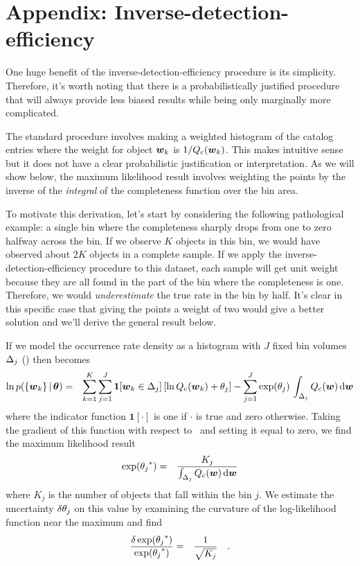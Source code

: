 \section{Appendix: Inverse-detection-efficiency}

One huge benefit of the inverse-detection-efficiency procedure is its
simplicity.
Therefore, it's worth noting that there is a probabilistically justified
procedure that will always provide less biased results while being only
marginally more complicated.

The standard procedure involves making a weighted histogram of the catalog
entries where the weight for object ${{\boldsymbol{w}}}_k$ is $1/{Q_\mathrm{c}}({{\boldsymbol{w}}}_k)$.
This makes intuitive sense but it does not have a clear probabilistic
justification or interpretation.
As we will show below, the maximum likelihood result involves weighting the
points by the inverse of the \emph{integral} of the completeness function over
the bin area.

To motivate this derivation, let's start by considering the following
pathological example: a single bin where the completeness sharply drops from
one to zero halfway across the bin.
If we observe $K$ objects in this bin, we would have observed about $2K$
objects in a complete sample.
If we apply the inverse-detection-efficiency procedure to this dataset, each
sample will get unit weight because they are all found in the part of the bin
where the completeness is one.
Therefore, we would \emph{underestimate} the true rate in the bin by half.
It's clear in this specific case that giving the points a weight of two would
give a better solution and we'll derive the general result below.

If we model the occurrence rate density as a histogram with $J$ fixed bin
volumes ${\Delta}_j$ () then  becomes
\begin{eqnarray}
\ln p(\{{{\boldsymbol{w}}}_k\}\,|\,{{\boldsymbol{{\theta}}}}) &=&
    \sum_{k=1}^K \sum_{j=1}^J \mathbf{1}[{{\boldsymbol{w}}}_k \in
        {\ensuremath{\Delta}}_j]\,[\ln{\ensuremath{Q_\mathrm{c}}}({{\boldsymbol{w}}}_k)+{\theta}_j]
    -\sum_{j=1}^J\exp({\theta}_j)\,
        \int_{{\Delta}_j} {Q_\mathrm{c}}({{\boldsymbol{w}}})\,\mathrm{d}{{\boldsymbol{w}}}
\end{eqnarray}
where the indicator function $\mathbf{1}[\cdot]$ is one if $\cdot$ is true and
zero otherwise.
Taking the gradient of this function with respect to \ratepars\ and setting it
equal to zero, we find the maximum likelihood result
\begin{eqnarray}\eqlabel{ml-ide}
\exp ({\ratepar_j}^*) &=&
\frac{K_j}{\int_{\binarea_j} \completeness(\entry)\dd\entry}
\end{eqnarray}
where $K_j$ is the number of objects that fall within the bin $j$.
We estimate the uncertainty $\delta{\ensuremath{\theta}}_j$ on this value by examining the
curvature of the log-likelihood function near the maximum and find
\begin{eqnarray}
\frac{\delta\exp({{\theta}_j}^*)}{\exp({{\theta}_j}^*)}
&=& \frac{1}{\sqrt{K_j}}
\quad.
\end{eqnarray}

